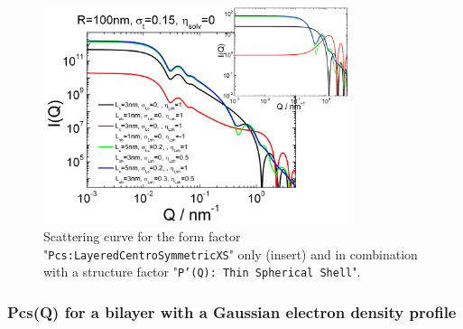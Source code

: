 \begin{figure}[htb]
\begin{center}
\includegraphics[width=0.8\textwidth,height=0.55\textwidth]{../images/form_factor/anisotropic/Pcs_planar2centrosymmIQ.png}
\end{center}
\caption{Scattering curve for the form factor "\texttt{Pcs:LayeredCentroSymmetricXS}" only (insert) and
in combination with a structure factor "\texttt{P'(Q): Thin Spherical Shell}".}
\label{fig:Pcs_planar2centrosymmIQ}
\end{figure}

\clearpage

\subsubsection{Pcs(Q) for a bilayer with a Gaussian electron density profile \cite{Pabst2000,Pabst2003}} ~\\
\label{plugin:Pcs:GaussianProfile}

